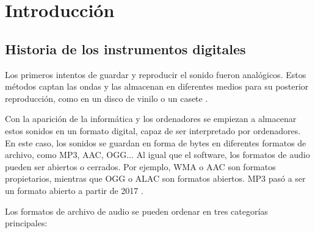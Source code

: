 
\chapter{Introducción} %
\label{cha:Introduccion}

    \section{Historia de los instrumentos digitales} %
    \label{sec:HistoriaDeLosInstrumentosDigitales}

        Los primeros intentos de guardar y reproducir el sonido fueron analógicos. Estos métodos captan las ondas y las
        almacenan en diferentes medios para su posterior reproducción, como en un disco de vinilo o un casete
        \cite{historia_instrumentos_digitales}.

        Con la aparición de la informática y los ordenadores se empiezan a almacenar estos sonidos en un formato
        digital, capaz de ser interpretado por ordenadores. En este caso, los sonidos se guardan en forma de bytes en
        diferentes formatos de archivo, como MP3, AAC, OGG... Al igual que el software, los formatos de audio pueden ser
        abiertos o cerrados. Por ejemplo, WMA \cite{wikipedia_wma} o AAC \cite{wikipedia_aac} son formatos propietarios,
        mientras que OGG \cite{wikipedia_ogg} o ALAC \cite{wikipedia_alac} son formatos abiertos. MP3 pasó a ser un
        formato abierto a partir de 2017 \cite{mp3_licencia}.

        Los formatos de archivo de audio se pueden ordenar en tres categorías principales:

        \begin{table}[ht]
            \caption{Tabla con ejemplos de formatos de las tres categorías \cite{formatos_audio}}
            \label{tab:my-table}
        \end{table}


